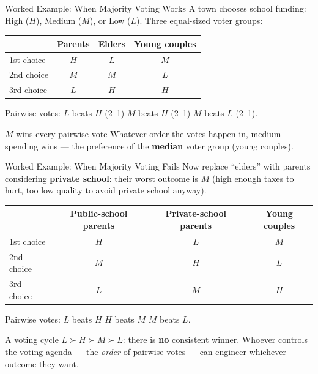 \documentclass[11pt,aspectratio=169]{beamer}
\begin{document}
\begin{frame}{Worked Example: When Majority Voting Works}
  A town chooses school funding: High ($H$), Medium ($M$), or Low ($L$). Three equal-sized voter groups:
  \begin{center}
  \small
  \begin{tabular}{@{}lccc@{}}
    \toprule
    & \textbf{Parents} & \textbf{Elders} & \textbf{Young couples} \\
    \midrule
    1st choice & $H$ & $L$ & $M$ \\
    2nd choice & $M$ & $M$ & $L$ \\
    3rd choice & $L$ & $H$ & $H$ \\
    \bottomrule
  \end{tabular}
  \end{center}
  \vspace{0.4em}
  Pairwise votes: $L$ beats $H$ (2--1) \quad $M$ beats $H$ (2--1) \quad $M$ beats $L$ (2--1).
  \begin{alertblock}{$M$ wins every pairwise vote}
    Whatever order the votes happen in, medium spending wins --- the preference of the \textbf{median} voter group (young couples).
  \end{alertblock}
\end{frame}

\begin{frame}{Worked Example: When Majority Voting Fails}
  Now replace ``elders'' with parents considering \textbf{private school}: their worst outcome is $M$ (high enough taxes to hurt, too low quality to avoid private school anyway).
  \begin{center}
  \small
  \begin{tabular}{@{}lccc@{}}
    \toprule
    & \textbf{Public-school parents} & \textbf{Private-school parents} & \textbf{Young couples} \\
    \midrule
    1st choice & $H$ & $L$ & $M$ \\
    2nd choice & $M$ & $H$ & $L$ \\
    3rd choice & $L$ & $M$ & $H$ \\
    \bottomrule
  \end{tabular}
  \end{center}
  \vspace{0.3em}
  Pairwise votes: $L$ beats $H$ \quad $H$ beats $M$ \quad $M$ beats $L$.
  \begin{alertblock}{A voting cycle}
    $L \succ H \succ M \succ L$: there is \textbf{no} consistent winner. Whoever controls the voting agenda --- the \emph{order} of pairwise votes --- can engineer whichever outcome they want.
  \end{alertblock}
\end{frame}
\end{document}
